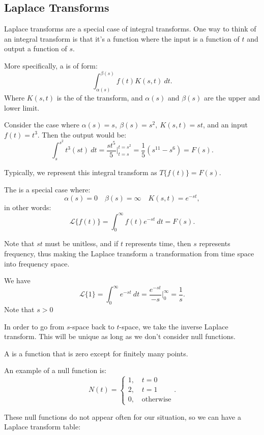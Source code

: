 \documentclass[../main/main.tex]{subfiles}
\begin{document}
\subsection{Laplace Transforms}
Laplace transforms are a special case of integral transforms. One way to think of an integral transform is that it's a function where the input is a function of $t$ and output a function of $s$.
\begin{definition}
	More specifically, a  is of form: \[
		\int_{\alpha(s)}^{\beta(s)} f(t) K(s,t)~dt
	.\] Where $K(s,t)$ is the  of the transform, and $\alpha(s)$ and $\beta(s)$ are the upper and lower limit.
\end{definition}
\begin{example}
	Consider the case where $\alpha(s)=s,\ \beta(s)=s^2,\ K(s,t) = st$, and an input $f(t) = t^3$. Then the output would be:  \[
		\int_{s}^{s^2}t ^{3}(st)~dt = \frac{st^{5}}{5}\bigg\rvert_{t=s}^{t=s^2}=\frac{1}{5}\left( s^{11}-s^{6} \right) =F(s)
	.\] 
\end{example}
\begin{definition}
	Typically, we represent this integral transform as $T\{f(t)\}=F(s)$.
\end{definition}
\begin{definition}
	The  is a special case where: \[
		\alpha(s)=0\quad\beta(s)=\infty\quad K(s,t) = e^{-st}
	,\] in other words: \[
	\mathcal{L}\{f(t)\} = \int_0^\infty f(t) e^{-st}~dt = F(s)
	.\]  
\end{definition}
\begin{remark}
	Note that $st$ must be unitless, and if  $t$ represents time, then $s$ represents frequency, thus making the Laplace transform a transformation from time space into frequency space.
\end{remark}
\begin{example}
	We have\[
	\mathcal{L}\{1\} = \int^\infty_0 e^{-st}~dt = \frac{e^{-st}}{-s}\bigg\rvert_0^\infty=\frac{1}{s}
	.\] Note that $s>0$
\end{example}
In order to go from $s$-space back to $t$-space, we take the inverse Laplace transform. This will be unique as long as we don't consider null functions.
\begin{definition}
	A  is a function that is zero except for finitely many points.
\end{definition}
\begin{example}
	An example of a null function is: \[
		N(t) = \begin{cases}
			1,\quad t=0\\
			2,\quad t=1\\
			0,\quad \text{otherwise}
		\end{cases}
	.\] 
\end{example}
These null functions do not appear often for our situation, so we can have a Laplace transform table: 
\end{document}
